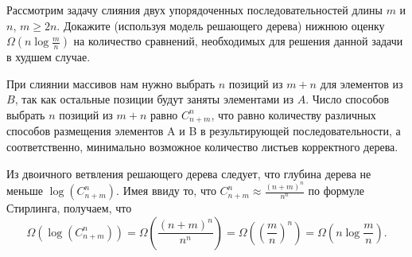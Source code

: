 \documentclass[11pt]{article}
\renewcommand{\ge}{\geqslant}   %
\begin{document}
\begin{problem}{15}
Рассмотрим задачу слияния двух упорядоченных последовательностей длины $m$ и $n$, $m \ge 2n$. Докажите (используя модель решающего дерева)
нижнюю оценку $\Omega(n \log \frac{m}{n})$ на количество сравнений, необходимых для решения данной задачи в худшем случае.
\end{problem}

\begin{solution}
	При слиянии массивов нам нужно выбрать $ n $ позиций из $ m + n $ для элементов из $ B $, так как остальные позиции будут заняты элементами из $ A $. Число способов выбрать $ n $ позиций из $ m + n $ равно $ C^{n}_{ n + m} $, что равно количеству различных способов размещения элементов A и B в результирующей последовательности, а соответственно, минимально возможное количество листьев корректного дерева.

	Из двоичного ветвления решающего дерева следует, что глубина дерева не меньше $ \log(C^{n}_{ n + m}) $. Имея ввиду то, что $ C^{n}_{ n + m} \approx \frac{(n + m)^n}{n^n} $ по формуле Стирлинга, получаем, что
	$$
		\Omega(\log(C^{n}_{ n + m})) = \Omega(\frac{(n + m)^n}{n^n}) = \Omega((\frac{m}{n})^n) = \Omega(n \log \frac{m}{n}).
	$$
\end{solution}
\end{document}
